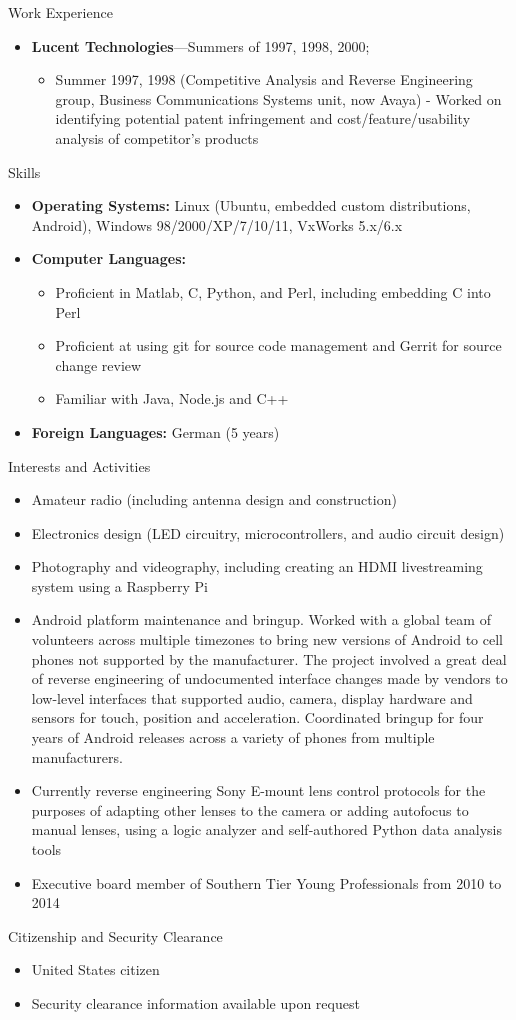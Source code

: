 \documentclass[10pt,oneside]{article}
\newenvironment{ressection}[1]{
	\vspace{4pt}
	{\Large#1}
	\begin{itemize}
	\vspace{3pt}
}{
	\end{itemize}
}
\newcommand{\resitem}[1]{
	\vspace{-4pt}
	\item \begin{flushleft} #1 \end{flushleft}
}
\newcommand{\ressubitem}[1]{
	\vspace{-1pt}
	\item \begin{flushleft} #1 \end{flushleft}
}
\newcommand{\resbigitem}[3]{
	\vspace{-5pt}
	\item
	\textbf{#1}---#2; \quad \textit{#3}
}
\newenvironment{ressubsec}[3]{
	\resbigitem{#1}{#2}{#3}
	\vspace{-2pt}
	\begin{itemize}
}{
	\end{itemize}
}
\newenvironment{reslist}[1]{
	\resitem{\textbf{#1}}
	\vspace{-5pt}
	\begin{itemize}
}{
	\end{itemize}
}
\newenvironment{ressection}[1]{
	\vspace{4pt}
	{\fontfamily{phv}\selectfont\Large#1}
	\begin{itemize}[leftmargin=12pt]
	\vspace{3pt}
}{
	\end{itemize}
}
\newcommand{\resitem}[1]{
	\vspace{-4pt}
	\item \begin{flushleft} #1 \end{flushleft}
}
\newcommand{\ressubitem}[1]{
	\vspace{-1pt}
	\item \begin{flushleft} #1 \end{flushleft}
}
\newcommand{\resbigitem}[2]{
	\vspace{-5pt}
	\item
	\textbf{#1}---\textit{#2}
}
\newenvironment{ressubsec}[2]{
	\resbigitem{#1}{#2}
	\vspace{-2pt}
	\begin{itemize}[leftmargin=12pt]
}{
	\end{itemize}
}
\newenvironment{reslist}[1]{
	\resitem{\textbf{#1}}
	\vspace{-5pt}
	\begin{itemize}[leftmargin=12pt]
}{
	\end{itemize}
}
\begin{document}
\begin{ressection}{Work Experience}
	\begin{ressubsec}{Lucent Technologies}{Summers of 1997, 1998, 2000}
	  \ressubitem{2000 (Silicon Processing Research Group) Independently created a CGI front-end to a simulation tool and software to process an ion implantation simulator output. Independently initiated a port of simulation tools from older Unix variants to Linux so that extensive simulation could be done on a low end machine to meet deadlines.}
          \ressubitem{Summer 1997, 1998 (Competitive Analysis and Reverse Engineering group, Business Communications Systems unit, now Avaya) - Worked on identifying potential patent infringement and cost/feature/usability analysis of competitor's products}
	\end{ressubsec}

\end{ressection}

\begin{ressection}{Skills}

	\resitem{\textbf{Operating Systems:} Linux (Ubuntu, embedded custom distributions, Android), Windows 98/2000/XP/7/10/11, VxWorks 5.x/6.x}

	\begin{reslist}{\textbf{Computer Languages:}}
	  \ressubitem{Proficient in Matlab, C, Python, and Perl, including embedding C into Perl}
          \ressubitem{Proficient at using git for source code management and Gerrit for source change review}
	  \ressubitem{Familiar with Java, Node.js and C++}
	\end{reslist}

	\resitem{\textbf{Foreign Languages:} German (5 years)}

\end{ressection}

\begin{ressection}{Interests and Activities}
		\resitem{Amateur radio (including antenna design and construction)}
		\resitem{Electronics design (LED circuitry, microcontrollers, and audio circuit design)}
		\resitem{Photography and videography, including creating an HDMI livestreaming system using a Raspberry Pi}
	        \resitem{Android platform maintenance and bringup.  Worked with a global team of volunteers across multiple timezones to bring new versions of Android to cell phones not supported by the manufacturer.  The project involved a great deal of reverse engineering of undocumented interface changes made by vendors to low-level interfaces that supported audio, camera, display hardware and sensors for touch, position and acceleration.  Coordinated bringup for four years of Android releases across a variety of phones from multiple manufacturers.}
                \resitem{Currently reverse engineering Sony E-mount lens control protocols for the purposes of adapting other lenses to the camera or adding autofocus to manual lenses, using a logic analyzer and self-authored Python data analysis tools}
		\resitem{Executive board member of Southern Tier Young Professionals from 2010 to 2014}
\end{ressection}

\begin{ressection}{Citizenship and Security Clearance}

	\resitem{United States citizen}

	\resitem{Security clearance information available upon request}

\end{ressection}
\end{document}
